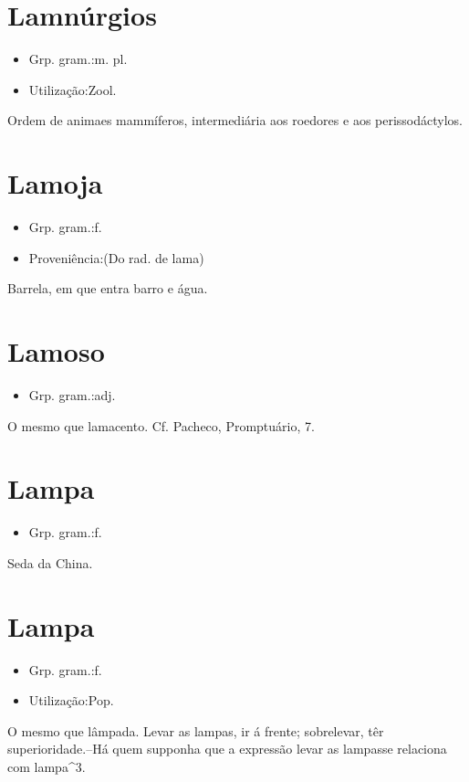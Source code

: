 \section{Lamnúrgios}
\begin{itemize}
\item {Grp. gram.:m. pl.}
\end{itemize}
\begin{itemize}
\item {Utilização:Zool.}
\end{itemize}
Ordem de animaes mammíferos, intermediária aos roedores e aos perissodáctylos.
\section{Lamoja}
\begin{itemize}
\item {Grp. gram.:f.}
\end{itemize}
\begin{itemize}
\item {Proveniência:(Do rad. de \textunderscore lama\textunderscore )}
\end{itemize}
Barrela, em que entra barro e água.
\section{Lamoso}
\begin{itemize}
\item {Grp. gram.:adj.}
\end{itemize}
O mesmo que \textunderscore lamacento\textunderscore . Cf. Pacheco, \textunderscore Promptuário\textunderscore , 7.
\section{Lampa}
\begin{itemize}
\item {Grp. gram.:f.}
\end{itemize}
Seda da China.
\section{Lampa}
\begin{itemize}
\item {Grp. gram.:f.}
\end{itemize}
\begin{itemize}
\item {Utilização:Pop.}
\end{itemize}
O mesmo que \textunderscore lâmpada\textunderscore . \textunderscore Levar as lampas\textunderscore , ir á frente; sobrelevar, têr superioridade.--Há quem supponha que a expressão \textunderscore levar as lampas\textunderscore  se relaciona com \textunderscore lampa\textunderscore ^3.
